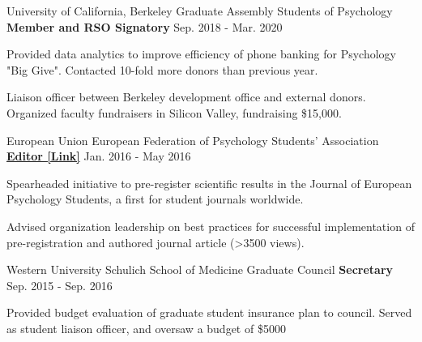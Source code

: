 

\begin{cventries}

  \cventry 
    {University of California, Berkeley} %
    {Graduate Assembly Students of Psychology}
    {\textbf{Member and RSO Signatory}} %
    {Sep. 2018 - Mar. 2020} %
    {
      \begin{cvitems} %
        \item {Provided data analytics to improve efficiency of phone banking for Psychology "Big Give". Contacted 10-fold more donors than previous year.}
        \item {Liaison officer between Berkeley development office and external donors. Organized faculty fundraisers in Silicon Valley, fundraising \$15,000.}
      \end{cvitems}
    }
    
  \cventry
    {European Union}
    {European Federation of Psychology Students' Association} %
    {\href{https://jeps.efpsa.org/articles/10.5334/jeps.401/}{\textbf{Editor [Link]}}} %
    {Jan. 2016 - May 2016} %
    {
      \begin{cvitems} %
        \item {Spearheaded initiative to pre-register scientific results in the Journal of European Psychology Students, a first for student journals worldwide.}
        \item {Advised organization leadership on best practices for successful implementation of pre-registration and authored journal article (>3500 views).}
      \end{cvitems}
    }
    
  \cventry
  	{Western University} %
  	{Schulich School of Medicine Graduate Council} %
    {\textbf{Secretary}} %
    {Sep. 2015 - Sep. 2016} %
    {
      \begin{cvitems} %
        \item {Provided budget evaluation of graduate student insurance plan to council. Served as student liaison officer, and oversaw a budget of \$5000}
      \end{cvitems}
    }
    

\end{cventries}
